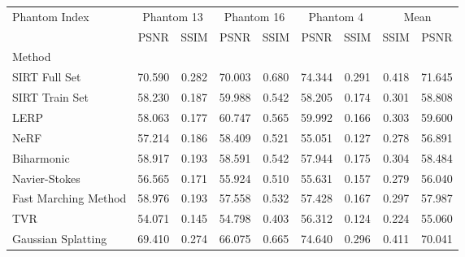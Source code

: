 \begin{tabular}{|l|cc|cc|cc|cc|}
\toprule
Phantom Index & \multicolumn{2}{c|}{Phantom 13} & \multicolumn{2}{c|}{Phantom 16} & \multicolumn{2}{c|}{Phantom 4} & \multicolumn{2}{c|}{Mean} \\
 & PSNR & SSIM & PSNR & SSIM & PSNR & SSIM & SSIM & PSNR \\
Method &  &  &  &  &  &  &  &  \\
\midrule
SIRT Full Set & 70.590 & 0.282 & 70.003 & 0.680 & 74.344 & 0.291 & 0.418 & 71.645 \\
SIRT Train Set & 58.230 & 0.187 & \cellcolor{rankthird}59.988 & \cellcolor{rankthird}0.542 & \cellcolor{rankthird}58.205 & \cellcolor{rankthird}0.174 & 0.301 & \cellcolor{rankthird}58.808 \\
LERP & 58.063 & 0.177 & \cellcolor{ranksecond}60.747 & \cellcolor{ranksecond}0.565 & \cellcolor{ranksecond}59.992 & 0.166 & \cellcolor{rankthird}0.303 & \cellcolor{ranksecond}59.600 \\
NeRF & 57.214 & 0.186 & 58.409 & 0.521 & \cellcolor{rankworst}55.051 & 0.127 & 0.278 & 56.891 \\
Biharmonic & \cellcolor{rankthird}58.917 & \cellcolor{rankthird}0.193 & 58.591 & \cellcolor{rankthird}0.542 & 57.944 & \cellcolor{ranksecond}0.175 & \cellcolor{ranksecond}0.304 & 58.484 \\
Navier-Stokes & 56.565 & 0.171 & 55.924 & 0.510 & 55.631 & 0.157 & 0.279 & 56.040 \\
Fast Marching Method & \cellcolor{ranksecond}58.976 & \cellcolor{rankthird}0.193 & 57.558 & 0.532 & 57.428 & 0.167 & 0.297 & 57.987 \\
TVR & \cellcolor{rankworst}54.071 & \cellcolor{rankworst}0.145 & \cellcolor{rankworst}54.798 & \cellcolor{rankworst}0.403 & 56.312 & \cellcolor{rankworst}0.124 & \cellcolor{rankworst}0.224 & \cellcolor{rankworst}55.060 \\
Gaussian Splatting & \cellcolor{rankfirst}69.410 & \cellcolor{rankfirst}0.274 & \cellcolor{rankfirst}66.075 & \cellcolor{rankfirst}0.665 & \cellcolor{rankfirst}74.640 & \cellcolor{rankfirst}0.296 & \cellcolor{rankfirst}0.411 & \cellcolor{rankfirst}70.041 \\
\bottomrule
\end{tabular}
